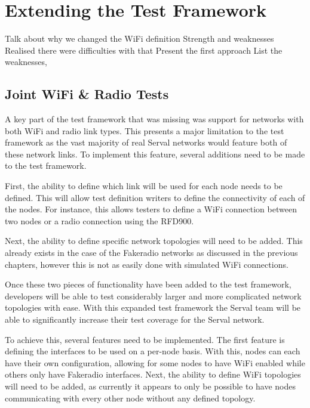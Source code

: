 
\chapter{Extending the Test Framework} %
\label{Chapter4}

Talk about why we changed the WiFi definition 
Strength and weaknesses
Realised there were difficulties with that
Present the first approach
List the weaknesses, 


\section{Joint WiFi \& Radio Tests}
A key part of the test framework that was missing was support for networks with both WiFi and radio link types. 
This presents a major limitation  to the test framework as the vast majority of real Serval networks would feature both of these network links.
To implement this feature, several additions need to be made to the test framework.

First, the ability to define which link will be used for each node needs to be defined.
This will allow test definition writers to define the connectivity of each of the nodes. 
For instance, this allows testers to define a WiFi connection between two nodes or a radio connection using the RFD900.

Next, the ability to define specific network topologies will need to be added.
This already exists in the case of the Fakeradio networks as discussed in the previous chapters, however this is not as easily done with simulated WiFi connections.

Once these two pieces of functionality have been added to the test framework, developers will be able to test considerably larger and more complicated network topologies with ease.
With this expanded test framework the Serval team will be able to significantly increase their test coverage for the Serval network.


To achieve this, several features need to be implemented. 
The first feature is defining the interfaces to be used on a per-node basis.
With this, nodes can each have their own configuration, allowing for some nodes to have WiFi enabled while others only have Fakeradio interfaces.
Next, the ability to define WiFi topologies will need to be added, as currently it appears to only be possible to have nodes communicating with every other node without any defined topology.

